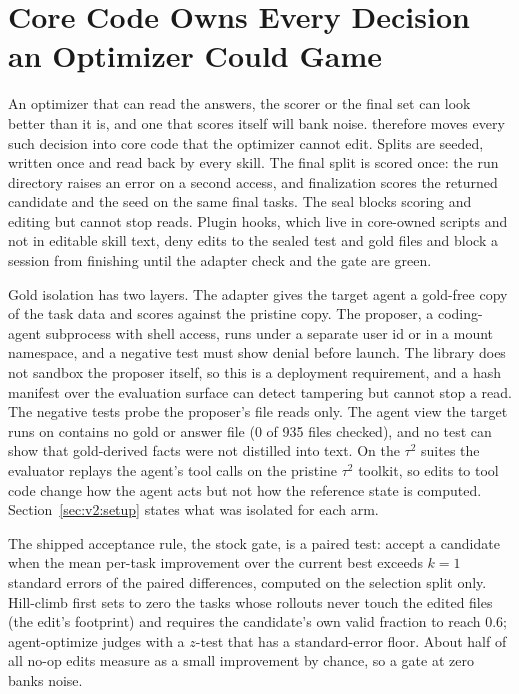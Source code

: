 \section{Core Code Owns Every Decision an Optimizer Could Game}
\label{sec:v2:evaluation}

An optimizer that can read the answers, the scorer or the final set can look better than it is, and one that scores itself will bank noise. \capevolve{} therefore moves every such decision into core code that the optimizer cannot edit. Splits are seeded, written once and read back by every skill. The final split is scored once: the run directory raises an error on a second access, and finalization scores the returned candidate and the seed on the same final tasks. The seal blocks scoring and editing but cannot stop reads. Plugin hooks, which live in core-owned scripts and not in editable skill text, deny edits to the sealed test and gold files and block a session from finishing until the adapter check and the gate are green.

Gold isolation has two layers. The adapter gives the target agent a gold-free copy of the task data and scores against the pristine copy. The proposer, a coding-agent subprocess with shell access, runs under a separate user id or in a mount namespace, and a negative test must show denial before launch. The library does not sandbox the proposer itself, so this is a deployment requirement, and a hash manifest over the evaluation surface can detect tampering but cannot stop a read. The negative tests probe the proposer's file reads only. The agent view the target runs on contains no gold or answer file (0 of 935 files checked), and no test can show that gold-derived facts were not distilled into text. On the $\tau^2$ suites the evaluator replays the agent's tool calls on the pristine $\tau^2$ toolkit, so edits to tool code change how the agent acts but not how the reference state is computed. Section~\ref{sec:v2:setup} states what was isolated for each arm.

The shipped acceptance rule, the stock gate, is a paired test: accept a candidate when the mean per-task improvement over the current best exceeds $k=1$ standard errors of the paired differences, computed on the selection split only. Hill-climb first sets to zero the tasks whose rollouts never touch the edited files (the edit's footprint) and requires the candidate's own valid fraction to reach 0.6; agent-optimize judges with a $z$-test that has a standard-error floor. About half of all no-op edits measure as a small improvement by chance, so a gate at zero banks noise.

